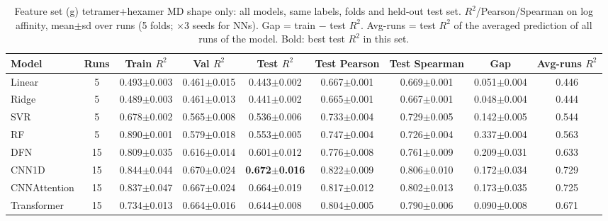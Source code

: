 \begin{table}[H]\centering\scriptsize\setlength{\tabcolsep}{3pt}
\caption{Feature set (g) tetramer+hexamer MD shape only: all models, same labels, folds and held-out test set. $R^2$/Pearson/Spearman on log affinity, mean$\pm$sd over runs (5 folds; $\times$3 seeds for NNs). Gap = train $-$ test $R^2$. Avg-runs = test $R^2$ of the averaged prediction of all runs of the model. Bold: best test $R^2$ in this set.}
\begin{tabular}{lcccccccc}\toprule
Model & Runs & Train $R^2$ & Val $R^2$ & Test $R^2$ & Test Pearson & Test Spearman & Gap & Avg-runs $R^2$\\\midrule
Linear & 5 & 0.493$\pm$0.003 & 0.461$\pm$0.015 & 0.443$\pm$0.002 & 0.667$\pm$0.001 & 0.669$\pm$0.001 & 0.051$\pm$0.004 & 0.446 \\
Ridge & 5 & 0.489$\pm$0.003 & 0.461$\pm$0.013 & 0.441$\pm$0.002 & 0.665$\pm$0.001 & 0.667$\pm$0.001 & 0.048$\pm$0.004 & 0.444 \\
SVR & 5 & 0.678$\pm$0.002 & 0.565$\pm$0.008 & 0.536$\pm$0.006 & 0.733$\pm$0.004 & 0.729$\pm$0.005 & 0.142$\pm$0.005 & 0.544 \\
RF & 5 & 0.890$\pm$0.001 & 0.579$\pm$0.018 & 0.553$\pm$0.005 & 0.747$\pm$0.004 & 0.726$\pm$0.004 & 0.337$\pm$0.004 & 0.563 \\
DFN & 15 & 0.809$\pm$0.035 & 0.616$\pm$0.014 & 0.601$\pm$0.012 & 0.776$\pm$0.008 & 0.761$\pm$0.009 & 0.209$\pm$0.031 & 0.633 \\
CNN1D & 15 & 0.844$\pm$0.044 & 0.670$\pm$0.024 & \textbf{0.672$\pm$0.016} & 0.822$\pm$0.009 & 0.806$\pm$0.010 & 0.172$\pm$0.034 & 0.729 \\
CNNAttention & 15 & 0.837$\pm$0.047 & 0.667$\pm$0.024 & 0.664$\pm$0.019 & 0.817$\pm$0.012 & 0.802$\pm$0.013 & 0.173$\pm$0.035 & 0.725 \\
Transformer & 15 & 0.734$\pm$0.013 & 0.664$\pm$0.016 & 0.644$\pm$0.008 & 0.804$\pm$0.005 & 0.790$\pm$0.006 & 0.090$\pm$0.008 & 0.671 \\
\bottomrule\end{tabular}\label{tab:fs_tetrahexaMD}\end{table}
